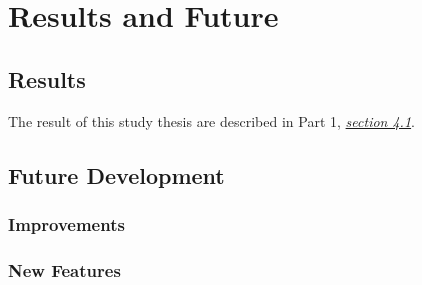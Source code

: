 \chapter{Results and Future}\label{part2_results_and_future}

\section{Results}\label{part2_results}
The result of this study thesis are described in Part 1, \hyperref[part1_results]{\emph{section 4.1}}.

\section{Future Development}\label{part2_future_development}

\subsection{Improvements}\label{small_improvements}
 
\subsection{New Features}\label{new_features}

\newpage{}